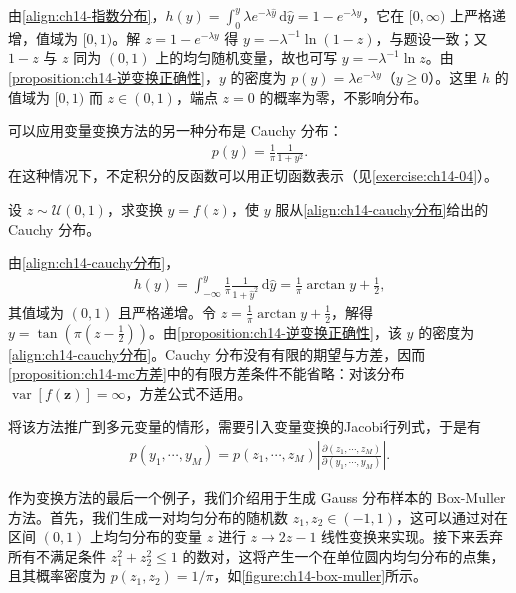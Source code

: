 \documentclass[../../main.tex]{subfiles}
\begin{document}
\begin{solution}由\eqref{align:ch14-指数分布}，$h(y)=\int_{0}^{y}\lambda e^{-\lambda \hat{y}}\,\mathrm{d}\hat{y}=1-e^{-\lambda y}$，它在 $[0,\infty)$ 上严格递增，值域为 $[0,1)$。解 $z=1-e^{-\lambda y}$ 得 $y=-\lambda^{-1}\ln(1-z)$，与题设一致；又 $1-z$ 与 $z$ 同为 $(0,1)$ 上的均匀随机变量，故也可写 $y=-\lambda^{-1}\ln z$。由\cref{proposition:ch14-逆变换正确性}，$y$ 的密度为 $p(y)=\lambda e^{-\lambda y}$（$y\geqslant 0$）。这里 $h$ 的值域为 $[0,1)$ 而 $z\in(0,1)$，端点 $z=0$ 的概率为零，不影响分布。
\end{solution}

可以应用变量变换方法的另一种分布是 Cauchy 分布：
\begin{align}
p(y)=\frac{1}{\pi}\frac{1}{1+y^{2}}.
\label{align:ch14-cauchy分布}
\end{align}
在这种情况下，不定积分的反函数可以用正切函数表示（见\cref{exercise:ch14-04}）。

\begin{example}\label{example:ch14-cauchy分布采样}
设 $z\sim\mathcal{U}(0,1)$，求变换 $y=f(z)$，使 $y$ 服从\eqref{align:ch14-cauchy分布}给出的 Cauchy 分布。
\end{example}

\begin{solution}由\eqref{align:ch14-cauchy分布}，
\begin{align*}
h(y)=\int_{-\infty}^{y}\frac{1}{\pi}\frac{1}{1+\hat{y}^{2}}\,\mathrm{d}\hat{y}=\frac{1}{\pi}\arctan y+\frac{1}{2},
\end{align*}
其值域为 $(0,1)$ 且严格递增。令 $z=\frac{1}{\pi}\arctan y+\frac{1}{2}$，解得 $y=\tan\left(\pi\left(z-\frac{1}{2}\right)\right)$。由\cref{proposition:ch14-逆变换正确性}，该 $y$ 的密度为\eqref{align:ch14-cauchy分布}。Cauchy 分布没有有限的期望与方差，因而\cref{proposition:ch14-mc方差}中的有限方差条件不能省略：对该分布 $\operatorname{var}[f(\bm{z})]=\infty$，方差公式不适用。
\end{solution}

将该方法推广到多元变量的情形，需要引入变量变换的Jacobi行列式，于是有
\begin{align}
p(y_{1},\cdots,y_{M})=p(z_{1},\cdots,z_{M})\left|\frac{\partial(z_{1},\cdots,z_{M})}{\partial(y_{1},\cdots,y_{M})}\right|.
\label{align:ch14-多元变量变换}
\end{align}

作为变换方法的最后一个例子，我们介绍用于生成 Gauss 分布样本的 Box-Muller 方法。首先，我们生成一对均匀分布的随机数 $z_{1},z_{2}\in(-1,1)$，这可以通过对在区间 $(0,1)$ 上均匀分布的变量 $z$ 进行 $z\rightarrow 2z-1$ 线性变换来实现。接下来丢弃所有不满足条件 $z_{1}^{2}+z_{2}^{2}\leqslant 1$ 的数对，这将产生一个在单位圆内均匀分布的点集，且其概率密度为 $p(z_{1},z_{2})=1/\pi$，如\cref{figure:ch14-box-muller}所示。
\end{document}
